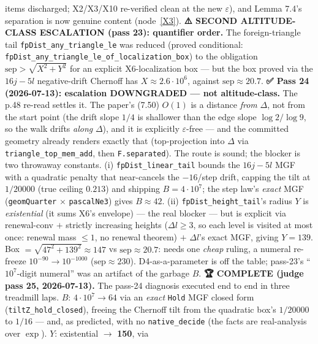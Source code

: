 \begin{lemma}
items discharged; X2/X3/X10 re-verified clean at the new \(\varepsilon\)), and Lemma
7.4's separation is now genuine content (node~\ref{X3}).
\textbf{⚠️ SECOND ALTITUDE-CLASS ESCALATION (pass 23): quantifier order.}  The
foreign-triangle tail \texttt{fpDist\_any\_triangle\_le} was reduced (proved
conditional: \texttt{fpDist\_any\_triangle\_le\_of\_localization\_box}) to the
obligation \(\mathrm{sep} > \sqrt{X^2+Y^2}\) for an explicit X6-localization box ---
but the box proved via the \(16j - 5l\) negative-drift Chernoff has
\(X \approx 2.6\cdot 10^6\), against \(\mathrm{sep} \approx 20.7\).
\textbf{✅ Pass 24 (2026-07-13): escalation DOWNGRADED --- not altitude-class.}  The
p.48 re-read settles it.  The paper's (7.50) \(O(1)\) is a distance \emph{from}
\(\Delta\), not from the start point (the drift slope \(1/4\) is shallower than the
edge slope \(\log 2/\log 9\), so the walk drifts \emph{along} \(\Delta\)), and it is
explicitly \(\varepsilon\)-free --- and the committed geometry already renders exactly
that (top-projection into \(\Delta\) via \texttt{triangle\_top\_mem\_add}, then
\texttt{F.separated}).  The route is sound; the blocker is two throwaway constants.
(i) \texttt{fpDist\_linear\_tail} bounds the \(16j-5l\) MGF with a quadratic penalty
that near-cancels the \(-16\)/step drift, capping the tilt at \(1/20000\) (true ceiling
\(0.213\)) and shipping \(B = 4\cdot 10^7\); the step law's \emph{exact} MGF
(\texttt{geomQuarter} \(\times\) \texttt{pascalNe3}) gives \(B \approx 42\).
(ii) \texttt{fpDist\_height\_tail}'s radius \(Y\) is \emph{existential} (it sums X6's
envelope) --- the real blocker --- but is explicit via renewal-conv \(+\) strictly
increasing heights (\(\Delta l \ge 3\), so each level is visited at most once: renewal
mass \(\le 1\), no renewal theorem) \(+\) \(\Delta l\)'s exact MGF, giving \(Y = 139\).
Box \(= \sqrt{47^2 + 139^2} \approx 147\) vs \(\mathrm{sep} \approx 20.7\): needs one
\emph{cheap} ruling, a numeral re-freeze \(10^{-90} \to 10^{-1000}\)
(\(\mathrm{sep} \approx 230\)).  D4-as-a-parameter is off the table; pass-23's
``\(10^7\)-digit numeral'' was an artifact of the garbage \(B\).
\textbf{🏆 COMPLETE (judge pass 25, 2026-07-13).}  The pass-24 diagnosis executed end to
end in three treadmill laps.  \(B\): \(4\cdot10^7 \to 64\) via an \emph{exact} \texttt{Hold}
MGF closed form (\texttt{tiltZ\_hold\_closed}), freeing the Chernoff tilt from the quadratic
box's \(1/20000\) to \(1/16\) --- and, as predicted, with no \texttt{native\_decide} (the
facts are real-analysis over \(\exp\)).  \(Y\): existential \(\to\) \textbf{150}, via

\end{lemma}
